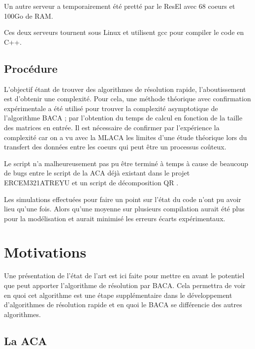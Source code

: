 \documentclass[10pt]{SelfArx} %
\begin{document}
Un autre serveur a temporairement été pretté par le ResEl avec 68 coeurs et 100Go de RAM.

Ces deux serveurs tournent sous Linux et utilisent gcc pour compiler le code en C++.
\subsection{Procédure}
L'objectif étant de trouver des algorithmes de résolution rapide, l'aboutissement est d'obtenir une complexité. Pour cela, une méthode théorique avec confirmation expérimentale a été utilisé pour trouver la complexité asymptotique de l'algorithme BACA \cite{liu_parallel_2020}; par l'obtention du temps de calcul en fonction de la taille des matrices en entrée. Il est nécessaire de confirmer par l'expérience la complexité car on a vu avec la MLACA les limites d'une étude théorique lors du transfert des données entre les coeurs \cite{ida_parallel_2014} qui peut être un processus coûteux.

Le script n'a malheureusement pas pu être terminé à temps à cause de beaucoup de bugs entre le script de la ACA déjà existant dans le projet ERCEM321\textunderscore ATREYU \cite{git_proj} et un script de décomposition QR \cite{ros_code}.

Les simulations effectuées pour faire un point sur l'état du code n'ont pu avoir lieu qu'une fois. Alors qu'une moyenne sur plusieurs compilation aurait été plus pour la modélisation et aurait minimisé les erreurs écarts expérimentaux.


\section{Motivations}
Une présentation de l'état de l'art est ici faite pour mettre en avant le potentiel que peut apporter l'algorithme de résolution par BACA. Cela permettra de voir en quoi cet algorithme est une étape supplémentaire dans le développement d'algorithmes de résolution rapide et en quoi le BACA se différencie des autres algorithmes.

\subsection{La ACA}
\end{document}
